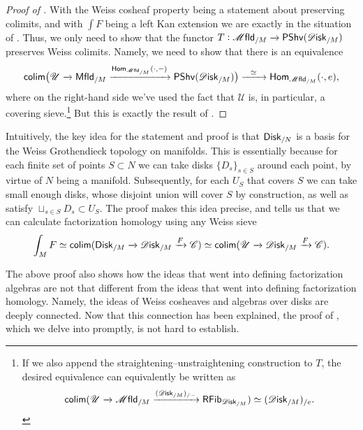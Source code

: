 \documentclass[../text]{subfiles}
\begin{document}
\begin{proof}[Proof of {}]
    With the Weiss cosheaf property being a statement about preserving colimits, and with $\int F$ being a left Kan extension we are exactly in the situation of . Thus, we only need to show that the functor $T: \mfld_{/M} \xrightarrow{} \mathsf{PShv} (\disk_{/M})$ preserves Weiss colimits. Namely, we need to show that there is an equivalence
    \begin{equation}
        \mathsf{colim} \big( \mathscr{U} \xrightarrow{} \mfld[r]_{/M} \xrightarrow{\mathsf{Hom}_{\mfld_{/M}}(\cdot, -)} \mathsf{PShv} (\disk_{/M}) \big) \xrightarrow{\ \ \simeq \ \ } \mathsf{Hom}_{\mfld_{/M}}(\cdot, e),
    \end{equation}
    where on the right-hand side we've used the fact that $\mathscr{U}$ is, in particular, a covering sieve.\footnote{If we also append the straightening--unstraightening construction to $T$, the desired equivalence can equivalently be written as
    \begin{equation}
        \mathsf{colim} (\mathscr{U} \xrightarrow{} \mfld_{/M} \xrightarrow{ (\disk_{/M})_{/-}} \mathsf{RFib}_{\disk_{/M}}) \simeq (\disk_{/M})_{/e}.
    \end{equation}}
    But this is exactly the result of .
\end{proof}

\begin{remark}
    Intuitively, the key idea for the statement and proof is that $\disk[r]_{/N}$ is a basis for the Weiss Grothendieck topology on manifolds. This is essentially because for each finite set of points $S \subset N$ we can take disks $\{ D_s \}_{s \in S}$ around each point, by virtue of $N$ being a manifold. Subsequently, for each $U_S$ that covers $S$ we can take small enough disks, whose disjoint union will cover $S$ by construction, as well as satisfy $\sqcup_{s \in S} D_s \subset U_S$. The proof makes this idea precise, and tells us that we can calculate factorization homology using any Weiss sieve
    \begin{equation}
        \int_M F \simeq \mathsf{colim}(\disk[r]_{/M} \xrightarrow{} \disk_{/M} \xrightarrow{F} \catC)
        \simeq \mathsf{colim}(\mathscr{U} \xrightarrow{} \disk_{/M} \xrightarrow{F} \catC).
    \end{equation}
\end{remark}

The above proof also shows how the ideas that went into defining factorization algebras are not that different from the ideas that went into defining factorization homology. Namely, the ideas of Weiss cosheaves and algebras over disks are deeply connected. Now that this connection has been explained, the proof of , which we delve into promptly, is not hard to establish.
\end{document}
